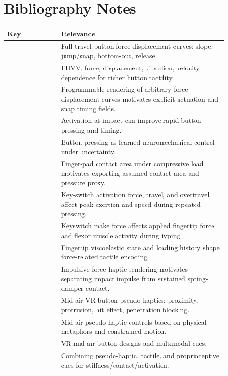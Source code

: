 \documentclass[11pt]{article}
\begin{document}
\section{Bibliography Notes}
\begin{longtable}{p{0.22\linewidth}p{0.68\linewidth}}
\toprule
Key & Relevance \\
\midrule
\cite{kim2013virtualbutton} & Full-travel button force-displacement curves: slope, jump/snap, bottom-out, release. \\
\cite{liao2020fdvv} & FDVV: force, displacement, vibration, velocity dependence for richer button tactility. \\
\cite{liao2018buttonsim} & Programmable rendering of arbitrary force-displacement curves motivates explicit actuation and snap timing fields. \\
\cite{kim2018impact} & Activation at impact can improve rapid button pressing and timing. \\
\cite{oulasvirta2018neuromechanics} & Button pressing as learned neuromechanical control under uncertainty. \\
\cite{dzidek2017fingerpad} & Finger-pad contact area under compressive load motivates exporting assumed contact area and pressure proxy. \\
\cite{radwin1997activation} & Key-switch activation force, travel, and overtravel affect peak exertion and speed during repeated pressing. \\
\cite{rempel1997keyswitch} & Keyswitch make force affects applied fingertip force and flexor muscle activity during typing. \\
\cite{saal2025viscoelasticity} & Fingertip viscoelastic state and loading history shape force-related tactile encoding. \\
\cite{constantinescu2004impulsive} & Impulsive-force haptic rendering motivates separating impact impulse from sustained spring-damper contact. \\
\cite{kim2022pseudobutton} & Mid-air VR button pseudo-haptics: proximity, protrusion, hit effect, penetration blocking. \\
\cite{speicher2019pseudocontrols} & Mid-air pseudo-haptic controls based on physical metaphors and constrained motion. \\
\cite{bermejo2021midairbuttons} & VR mid-air button designs and multimodal cues. \\
\cite{ariza2022holitouch} & Combining pseudo-haptic, tactile, and proprioceptive cues for stiffness/contact/activation. \\

\end{longtable}
\end{document}
